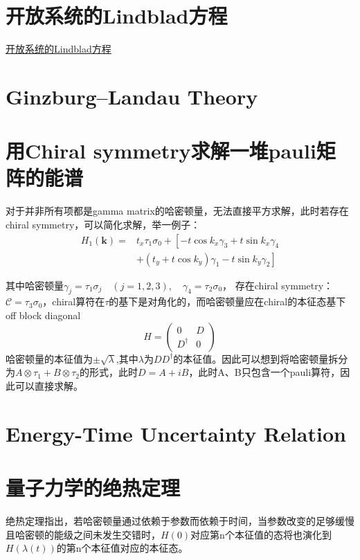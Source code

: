 \documentclass[10pt,openany]{book}
\theoremstyle{thmstyle} %
\theoremstyle{defstyle} %
\theoremstyle{prostyle} %
\begin{document}
\section{开放系统的Lindblad方程}
\href{https://zhuanlan.zhihu.com/p/374537100}{开放系统的Lindblad方程}
\section{Ginzburg–Landau Theory}
\section{用Chiral symmetry求解一堆pauli矩阵的能谱}
对于并非所有项都是gamma matrix的哈密顿量，无法直接平方求解，此时若存在chiral symmetry，可以简化求解，举一例子：
\begin{equation}
  \begin{aligned}
    H_1(\mathbf{k})= & t_x \tau_1 \sigma_0+\left[-t \cos k_x \gamma_3+t \sin k_x \gamma_4\right. \\
    & \left.+\left(t_y+t \cos k_y\right) \gamma_1-t \sin k_y \gamma_2\right]
    \end{aligned}
\end{equation}

其中哈密顿量$ \gamma_j=\tau_1 \sigma_j \quad(j=1,2,3), \quad \gamma_4=\tau_2 \sigma_0 $， 存在chiral symmetry：$ \mathcal{C}=\tau_3 \sigma_0 $，chiral算符在$ \tau $的基下是对角化的，而哈密顿量应在chiral的本征态基下off block diagonal
\begin{equation*}
  H=\left(\begin{array}{cc}
    0 & D \\
    D^{\dagger} & 0
    \end{array}\right)
\end{equation*}
哈密顿量的本征值为$ \pm \sqrt{\lambda} $,其中$ \lambda $为$ D D^{\dagger} $的本征值。因此可以想到将哈密顿量拆分为$ A\otimes \tau_1 + B\otimes \tau_2 $的形式，此时$ D = A + iB $，此时A、B只包含一个pauli算符，因此可以直接求解。   
\section{Energy-Time Uncertainty Relation}

\section{量子力学的绝热定理}
绝热定理指出，若哈密顿量通过依赖于参数而依赖于时间，当参数改变的足够缓慢且哈密顿的能级之间未发生交错时，$ H(0) $对应第n个本征值的态将也演化到$ H(\lambda(t)) $的第n个本征值对应的本征态。
\end{document}
